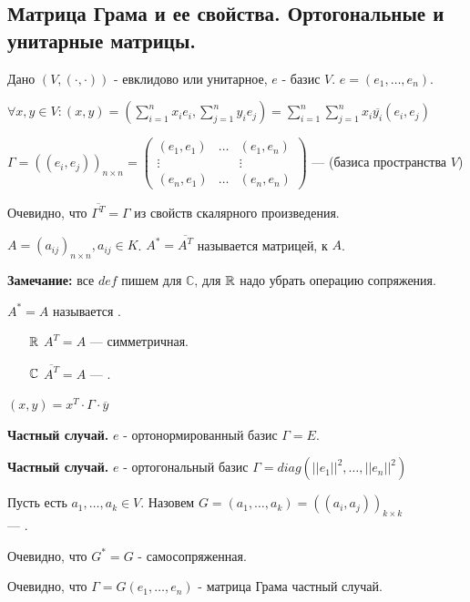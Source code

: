 \pagebreak
\subsection{Матрица Грама и ее свойства. Ортогональные и унитарные матрицы.}

Дано $(V, (\cdot,\cdot))$ - евклидово или унитарное, $e$ - базис $V$. $e=(e_1,\ldots, e_n)$.

$\forall x,y \in V: (x,y) = (\sum\limits_{i=1}^n x_i e_i, \sum\limits_{j=1}^n y_i e_j) = \sum\limits_{i=1}^n\sum\limits_{j=1}^n x_i \overline{y_i} (e_i, e_j)$

 $\Gamma  = ((e_i,e_j))_{n\times n} = \begin{pmatrix}
    (e_1,e_1) & \ldots & (e_1, e_n)\\
    \vdots & &\vdots\\
    (e_n,e_1) & \ldots & (e_n,e_n)
\end{pmatrix}$ --- (базиса пространства $V$)

Очевидно, что $\overline{\Gamma^T}  = \Gamma$ из свойств скалярного произведения.

 $A = (a_{ij})_{n \times n}, a_{ij} \in K$. $A^* = \overline{A^T}$ называется матрицей,  к $A$.

\textbf{Замечание:} все $def$ пишем для $\mathbb{C}$, для $\mathbb{R}$ надо убрать операцию сопряжения.

 $A^* = A$ называется .
\begin{enumerate}
    \item[$\mathbb{R}$] $A^T = A$ --- симметричная.
    \item[$\mathbb{C}$] $\overline{A^T}=A$  --- .
\end{enumerate}

$(x,y)   = x^T \cdot \Gamma \cdot \overline{y}$

\textbf{Частный случай.} $e$ - ортонормированный базис $\Gamma = E$.

\textbf{Частный случай.} $e$ - ортогональный базис $\Gamma = diag(||e_1||^2,\ldots,||e_n||^2)$

 Пусть есть $a_1,\ldots, a_k\in V$. Назовем $G = (a_1,\ldots,a_k) =((a_i,a_j))_{k\times k}$ \\--- .

Очевидно, что $G^* = G$ - самосопряженная.

Очевидно, что $\Gamma = G(e_1,\ldots, e_n)$ - матрица Грама частный случай.

